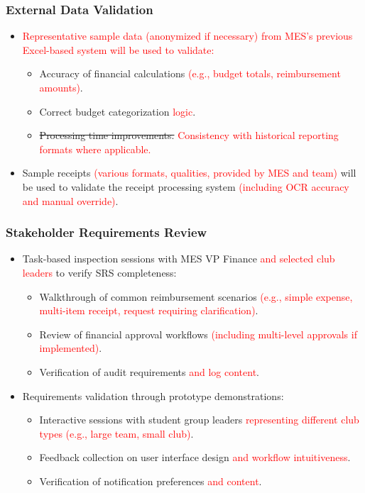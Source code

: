 \documentclass[12pt, titlepage]{article}
\begin{document}
\subsubsection*{External Data Validation}
\begin{itemize}
   \item \textcolor{red}{Representative sample data (anonymized if necessary) from MES's previous Excel-based system will be used to validate:}
   \begin{itemize}
       \item Accuracy of financial calculations \textcolor{red}{(e.g., budget totals, reimbursement amounts)}.
       \item Correct budget categorization \textcolor{red}{logic}.
       \item \sout{Processing time improvements.} \textcolor{red}{Consistency with historical reporting formats where applicable.}
   \end{itemize}
   \item Sample receipts \textcolor{red}{(various formats, qualities, provided by MES and team)} will be used to validate the receipt processing system \textcolor{red}{(including OCR accuracy and manual override)}.
\end{itemize}

\subsubsection*{Stakeholder Requirements Review}
\begin{itemize}
   \item Task-based inspection sessions with MES VP Finance \textcolor{red}{and selected club leaders} to verify SRS completeness:
   \begin{itemize}
       \item Walkthrough of common reimbursement scenarios \textcolor{red}{(e.g., simple expense, multi-item receipt, request requiring clarification)}.
       \item Review of financial approval workflows \textcolor{red}{(including multi-level approvals if implemented)}.
       \item Verification of audit requirements \textcolor{red}{and log content}.
   \end{itemize}
   \item Requirements validation through prototype demonstrations:
   \begin{itemize}
       \item Interactive sessions with student group leaders \textcolor{red}{representing different club types (e.g., large team, small club)}.
       \item Feedback collection on user interface design \textcolor{red}{and workflow intuitiveness}.
       \item Verification of notification preferences \textcolor{red}{and content}.
   \end{itemize}
\end{itemize}
\end{document}
